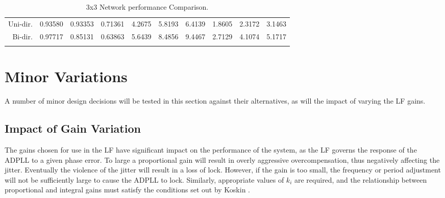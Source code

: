 \begin{table}[!ht]
\begin{center}
\begin{footnotesize}
\begin{tabular}{ll|r|r|r|r|r|r|r|r|r|}
                \multicolumn{2}{|r|}{Uni-dir.}  &0.93580 &0.93353 &0.71361    &4.2675 &5.8193 &6.4139    &1.8605&2.3172&3.1463  \T\\
                \multicolumn{2}{|r|}{Bi-dir.}   &0.97717 &0.85131 &0.63863    &5.6439 &8.4856 &9.4467    &2.7129&4.1074&5.1717  \T\\
                \hline
                \B                
            \end{tabular}
        \end{footnotesize}
        \caption{3x3 Network performance Comparison.}
        \label{table:3x3perf}
    \end{center}
    \vspace{-0.5cm}
\end{table}

\section{Minor Variations}\label{section:minor_variations}
A number of minor design decisions will be tested in this section against their alternatives, as will the impact of varying the \ac{LF} gains.

\subsection{Impact of Gain Variation}
The gains chosen for use in the \acl{LF} have significant impact on the performance of the system, as the \ac{LF} governs the response of the \ac{ADPLL} to a given phase error. To large a proportional gain will result in overly aggressive overcompensation, thus negatively affecting the jitter. Eventually the violence of the jitter will result in a loss of lock. However, if the gain is too small, the frequency or period adjustment will not be sufficiently large to cause the \ac{ADPLL} to lock. Similarly, appropriate values of $k_i$ are required, and the relationship between proportional and integral gains must satisfy the conditions set out by Koskin \cite{koskin2018generation}.

